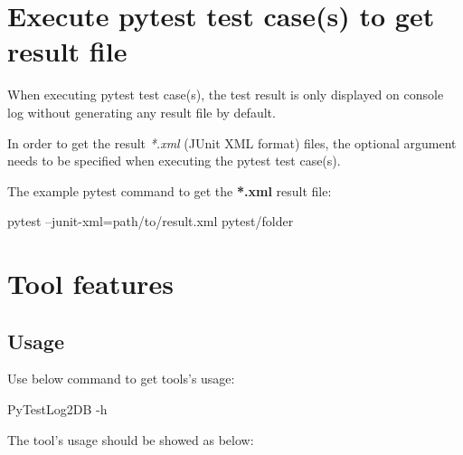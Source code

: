 



\hypertarget{get-the-pytest-xml-result}{%
\section{Execute pytest test case(s) to get result file}\label{get-the-pytest-xml-result}}

  When executing pytest test case(s), the test result is only displayed on
  console log without generating any result file by default.

  In order to get the result \emph{*.xml} (JUnit XML format) files, 
  the optional argument  needs to be specified when
  executing the pytest test case(s).

  The example pytest command to get the \textbf{*.xml} result file:

\begin{robotlog}
pytest --junit-xml=path/to/result.xml pytest/folder
\end{robotlog}

\hypertarget{tool-features}{%
\section{Tool features}\label{tool-features}}

  \hypertarget{usage}{%
  \subsection{Usage}\label{usage}}
    Use below command to get tools's usage:
\begin{robotlog}
PyTestLog2DB -h
\end{robotlog}
  
    The tool's usage should be showed as below:

